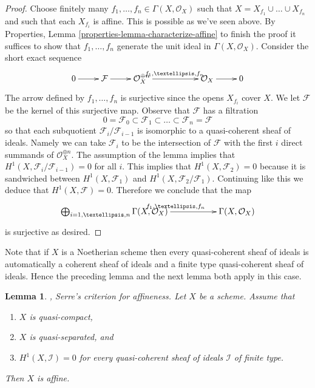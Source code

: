 \documentclass{stacks-project}
\newenvironment{reference}{\comment}{\endcomment}
\newenvironment{slogan}{\comment}{\endcomment}
\theoremstyle{plain}
\newtheorem{lemma}[subsection]{Lemma}
\theoremstyle{definition}
\theoremstyle{remark}
\numberwithin{equation}{subsection}
\begin{document}
\begin{proof}
\medskip\noindent
Choose finitely many $f_1, \ldots, f_n \in \Gamma(X, \mathcal{O}_X)$
such that $X = X_{f_1} \cup \ldots \cup X_{f_n}$ and such that each
$X_{f_i}$ is affine. This is possible as we've seen above.
By Properties, Lemma \ref{properties-lemma-characterize-affine}
to finish the proof it suffices
to show that $f_1, \ldots, f_n$ generate the unit ideal in
$\Gamma(X, \mathcal{O}_X)$. Consider the short exact sequence
$$
\xymatrix{
0 \ar[r] &
\mathcal{F} \ar[r] &
\mathcal{O}_X^{\oplus n} \ar[rr]^{f_1, \ldots, f_n} & &
\mathcal{O}_X \ar[r] &
0
}
$$
The arrow defined by $f_1, \ldots, f_n$ is surjective since the
opens $X_{f_i}$ cover $X$. We let $\mathcal{F}$ be the kernel
of this surjective map.
Observe that $\mathcal{F}$ has a filtration
$$
0 = \mathcal{F}_0 \subset \mathcal{F}_1 \subset
\ldots \subset \mathcal{F}_n = \mathcal{F}
$$
so that each subquotient $\mathcal{F}_i/\mathcal{F}_{i - 1}$ is
isomorphic to a quasi-coherent sheaf of ideals.
Namely we can take $\mathcal{F}_i$ to be the intersection of
$\mathcal{F}$ with the first $i$ direct summands of
$\mathcal{O}_X^{\oplus n}$.
The assumption
of the lemma implies that $H^1(X, \mathcal{F}_i/\mathcal{F}_{i - 1}) = 0$
for all $i$. This implies that
$H^1(X, \mathcal{F}_2) = 0$ because it is sandwiched between
$H^1(X, \mathcal{F}_1)$ and $H^1(X, \mathcal{F}_2/\mathcal{F}_1)$.
Continuing like this we deduce that $H^1(X, \mathcal{F}) = 0$.
Therefore we conclude that the map
$$
\xymatrix{
\bigoplus\nolimits_{i = 1, \ldots, n} \Gamma(X, \mathcal{O}_X)
\ar[rr]^{f_1, \ldots, f_n} & &
\Gamma(X, \mathcal{O}_X)
}
$$
is surjective as desired.
\end{proof}

\noindent
Note that if $X$ is a Noetherian scheme then every quasi-coherent
sheaf of ideals is automatically a coherent sheaf of ideals and a
finite type quasi-coherent sheaf of ideals. Hence
the preceding lemma and the next lemma both apply in this case.

\begin{lemma}
\label{lemma-quasi-separated-h1-zero-covering}
\begin{reference}
\cite{Serre-criterion}, \cite[II, Theorem 5.2.1]{EGA}
\end{reference}
\begin{slogan}
Serre's criterion for affineness.
\end{slogan}
Let $X$ be a scheme. Assume that
\begin{enumerate}
\item $X$ is quasi-compact,
\item $X$ is quasi-separated, and
\item $H^1(X, \mathcal{I}) = 0$ for every quasi-coherent sheaf
of ideals $\mathcal{I}$ of finite type.
\end{enumerate}
Then $X$ is affine.
\end{lemma}
\end{document}
